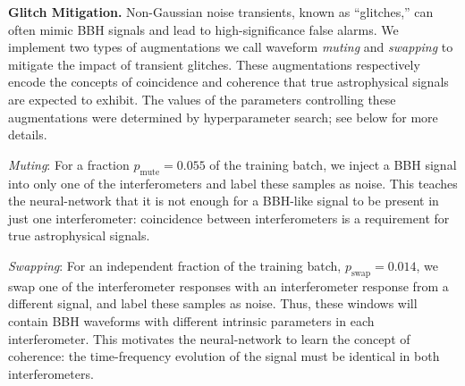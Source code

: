 \begin{refsection}
\textbf{Glitch Mitigation.}
Non-Gaussian noise transients, known as ``glitches,'' can often mimic BBH signals and lead to high-significance false alarms. 
We implement two types of augmentations we call waveform \emph{muting} and \emph{swapping} to mitigate the impact of transient glitches. 
These augmentations respectively encode the concepts of coincidence and coherence that true astrophysical signals are expected to exhibit. 
The values of the parameters controlling these augmentations were determined by hyperparameter search; see below for more details.

\emph{Muting}: For a fraction $p_{\text{mute}} = 0.055$ of the training batch, we inject a BBH signal into only one of the interferometers and label these samples as noise. 
This teaches the neural-network that it is not enough for a BBH-like signal to be present in just one interferometer: coincidence between interferometers is a requirement for true astrophysical signals. 

\emph{Swapping}: For an independent fraction of the training batch, $p_{\text{swap}} = 0.014$, we swap one of the interferometer responses with an interferometer response from a different signal, and label these samples as noise. 
Thus, these windows will contain BBH waveforms with different intrinsic parameters in each interferometer. 
This motivates the neural-network to learn the concept of coherence: the time-frequency evolution of the signal must be identical in both interferometers.





\end{refsection}
